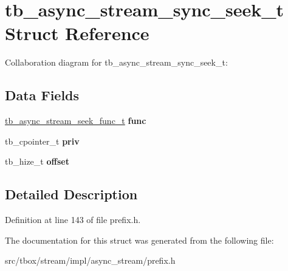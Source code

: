 \hypertarget{structtb__async__stream__sync__seek__t}{\section{tb\-\_\-async\-\_\-stream\-\_\-sync\-\_\-seek\-\_\-t Struct Reference}
\label{structtb__async__stream__sync__seek__t}
}


Collaboration diagram for tb\-\_\-async\-\_\-stream\-\_\-sync\-\_\-seek\-\_\-t\-:
\subsection*{Data Fields}
\begin{DoxyCompactItemize}
\item 
\hypertarget{structtb__async__stream__sync__seek__t_a7e9eafe83b4932979ded6f33be94f161}{\hyperlink{async__stream_8h_a3c6ab6b8e797a0bab6f9f150087ef39b}{tb\-\_\-async\-\_\-stream\-\_\-seek\-\_\-func\-\_\-t} {\bfseries func}}\label{structtb__async__stream__sync__seek__t_a7e9eafe83b4932979ded6f33be94f161}

\item 
\hypertarget{structtb__async__stream__sync__seek__t_a3a5960d38f2a46ff63bf3769ab2abd35}{tb\-\_\-cpointer\-\_\-t {\bfseries priv}}\label{structtb__async__stream__sync__seek__t_a3a5960d38f2a46ff63bf3769ab2abd35}

\item 
\hypertarget{structtb__async__stream__sync__seek__t_ab3f47a4f89bdebf715cf8fe6dd470047}{tb\-\_\-hize\-\_\-t {\bfseries offset}}\label{structtb__async__stream__sync__seek__t_ab3f47a4f89bdebf715cf8fe6dd470047}

\end{DoxyCompactItemize}


\subsection{Detailed Description}


Definition at line 143 of file prefix.\-h.



The documentation for this struct was generated from the following file\-:\begin{DoxyCompactItemize}
\item 
src/tbox/stream/impl/async\-\_\-stream/prefix.\-h\end{DoxyCompactItemize}
